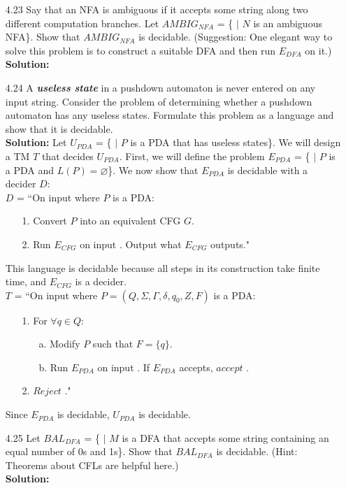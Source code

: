 \begin{enumerate}
\item[4.23]Say that an NFA is ambiguous if it accepts some string along two different computation branches. Let $AMBIG_{NFA}$ = \{ $|$ $N$ is an ambiguous NFA\}. Show that $AMBIG_{NFA}$ is decidable. (Suggestion: One elegant way to solve this problem is to construct a suitable DFA and then run $E_{DFA}$ on it.)
\\
\textbf{Solution:} \alreadyanswered

\item[4.24]A \emph{\textbf{useless state}} in a pushdown automaton is never entered on any input string. Consider the problem of determining whether a pushdown automaton has any useless states. Formulate this problem as a language and show that it is decidable.
\\
\textbf{Solution:} Let $U_{PDA}$ = \{ $|$ $P$ is a PDA that has useless states\}. We will design a TM $T$ that decides $U_{PDA}$. First, we will define the problem $E_{PDA}$ = \{ $|$ $P$ is a PDA and $L(P) = \varnothing$\}. We now show that $E_{PDA}$ is decidable with a decider $D$:
\\
$D$ = ``On input  where $P$ is a PDA:
\begin{enumerate}
\itemsep0em
\item[1.]Convert $P$ into an equivalent CFG $G$.
\item[2.]Run $E_{CFG}$ on input . Output what $E_{CFG}$ outputs."
\end{enumerate}
This language is decidable because all steps in its construction take finite time, and $E_{CFG}$ is a decider.
\\
$T$ = ``On input  where $P = (Q, \Sigma, \Gamma, \delta, q_0, Z, F)$ is a PDA:
\begin{enumerate}
\itemsep0em
\item[1.]For $\forall q \in Q$:
\begin{enumerate}
\item[a.]Modify $P$ such that $F = \{q\}$.
\item[b.]Run $E_{PDA}$ on input . If $E_{PDA}$ accepts, $accept$ .
\end{enumerate}
\item[2.]$Reject$ ."
\end{enumerate}
Since $E_{PDA}$ is decidable, $U_{PDA}$ is decidable.

\item[4.25]Let $BAL_{DFA}$ = \{ $|$ $M$ is a DFA that accepts some string containing an equal number of 0s and 1s\}. Show that $BAL_{DFA}$ is decidable. (Hint: Theorems about CFLs are helpful here.)
\\
\textbf{Solution:} \alreadyanswered

\end{enumerate}